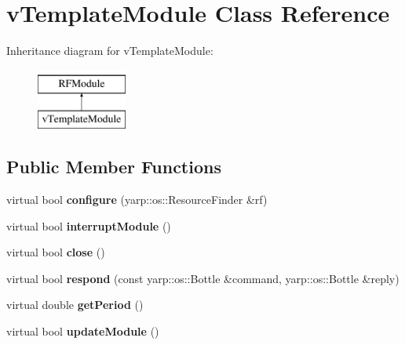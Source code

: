 \hypertarget{classvTemplateModule}{\section{v\-Template\-Module Class Reference}
\label{classvTemplateModule}
}
Inheritance diagram for v\-Template\-Module\-:\begin{figure}[H]
\begin{center}
\leavevmode
\includegraphics[height=2.000000cm]{classvTemplateModule}
\end{center}
\end{figure}
\subsection*{Public Member Functions}
\begin{DoxyCompactItemize}
\item 
\hypertarget{classvTemplateModule_ac673213dfbb34f1719a8a17b5549f3ab}{virtual bool {\bfseries configure} (yarp\-::os\-::\-Resource\-Finder \&rf)}\label{classvTemplateModule_ac673213dfbb34f1719a8a17b5549f3ab}

\item 
\hypertarget{classvTemplateModule_a4104e88622abbd133df02af82988a167}{virtual bool {\bfseries interrupt\-Module} ()}\label{classvTemplateModule_a4104e88622abbd133df02af82988a167}

\item 
\hypertarget{classvTemplateModule_ac94b9d709bf56efac2a9f82f393843dc}{virtual bool {\bfseries close} ()}\label{classvTemplateModule_ac94b9d709bf56efac2a9f82f393843dc}

\item 
\hypertarget{classvTemplateModule_aa2e6141f31e4cea8f94f0b5a1b08a934}{virtual bool {\bfseries respond} (const yarp\-::os\-::\-Bottle \&command, yarp\-::os\-::\-Bottle \&reply)}\label{classvTemplateModule_aa2e6141f31e4cea8f94f0b5a1b08a934}

\item 
\hypertarget{classvTemplateModule_a691e4424b5de4ee43e249421a24a87cb}{virtual double {\bfseries get\-Period} ()}\label{classvTemplateModule_a691e4424b5de4ee43e249421a24a87cb}

\item 
\hypertarget{classvTemplateModule_abd78b6b36cc849bbc34d6a3033cc4654}{virtual bool {\bfseries update\-Module} ()}\label{classvTemplateModule_abd78b6b36cc849bbc34d6a3033cc4654}

\end{DoxyCompactItemize}


